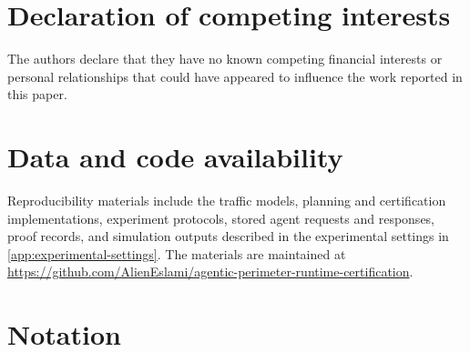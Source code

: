 \documentclass[preprint,12pt]{elsarticle}
\theoremstyle{definition}
\theoremstyle{plain}
\theoremstyle{definition}
\theoremstyle{plain}
\newcommand{\appref}[1]{\ref{#1}}
\begin{document}
\section*{Declaration of competing interests}
The authors declare that they have no known competing financial interests or
personal relationships that could have appeared to influence the work
reported in this paper.

\section*{Data and code availability}
Reproducibility materials include the traffic models, planning and
certification implementations, experiment protocols, stored agent requests
and responses, proof records, and simulation outputs described in the
experimental settings in \appref{app:experimental-settings}. The materials are maintained at
\url{https://github.com/AlienEslami/agentic-perimeter-runtime-certification}.


\appendix
\renewcommand{\theequation}{\Alph{section}.\arabic{equation}}
\renewcommand{\thetable}{\Alph{section}.\arabic{table}}
\Needspace{0.78\textheight}
\section{Notation}
\label{app:notation}
\end{document}
